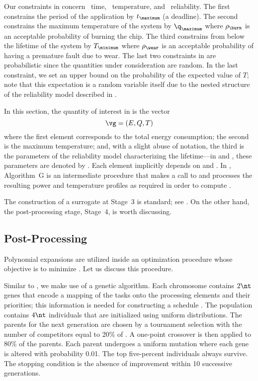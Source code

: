 Our constraints in  concern \one~time, \two~temperature,
and \three~reliability. The first constrains the period of the application by
$t_\maximum$ (a deadline). The second constrains the maximum temperature of the
system by $\q_\maximum$ where $\rho_\burn$ is an acceptable probability of
burning the chip. The third constrains from below the lifetime of the system by
$T_\minimum$ where $\rho_\wear$ is an acceptable probability of having a
premature fault due to wear. The last two constraints in
 are probabilistic since the quantities under
consideration are random. In the last constraint, we set an upper bound on the
probability of the expected value of $T$; note that this expectation is a random
variable itself due to the nested structure of the reliability model described
in .

In this section, the quantity of interest \g in  is the
vector
\[
  \vg = (E, Q, T)
\]
where the first element corresponds to the total energy consumption; the second
is the maximum temperature; and, with a slight abuse of notation, the third is
the parameters of the reliability model characterizing the lifetime---in
 and , these
parameters are denoted by \vg. Each element implicitly depends on \schedule and
\vu. In , Algorithm~G is an intermediate procedure that
makes a call to  and processes the
resulting power and temperature profiles as required in order to compute \vg.

The construction of a surrogate at Stage~3 is standard; see
. On the other hand, the post-processing
stage, Stage~4, is worth discussing.

\subsection{Post-Processing}

Polynomial expansions are utilized inside an optimization procedure whose
objective is to minimize . Let us discuss this procedure.

Similar to , we make use of a genetic algorithm.
Each chromosome contains $2 \nt$ genes that encode a mapping of the tasks onto
the processing elements and their priorities; this information is needed for
constructing a schedule \schedule. The population contains $4 \nt$ individuals
that are initialized using uniform distributions. The parents for the next
generation are chosen by a tournament selection with the number of competitors
equal to 20\% of \nt. A one-point crossover is then applied to 80\% of the
parents. Each parent undergoes a uniform mutation where each gene is altered
with probability 0.01. The top five-percent individuals always survive. The
stopping condition is the absence of improvement within 10 successive
generations.

